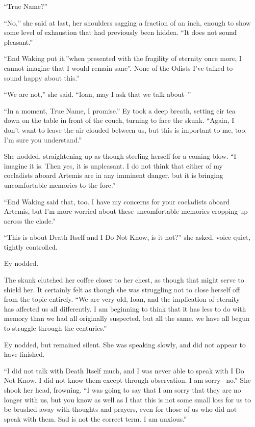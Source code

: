 ``True Name?''

``No,'' she said at last, her shoulders sagging a fraction of an inch, enough to show some level of exhaustion that had previously been hidden. ``It does not sound pleasant.''

``End Waking put it,''when presented with the fragility of eternity once more, I cannot imagine that I would remain sane''. None of the Odists I've talked to sound happy about this.''

``We are not,'' she said. ``Ioan, may I ask that we talk about--''

``In a moment, True Name, I promise.'' Ey took a deep breath, setting eir tea down on the table in front of the couch, turning to face the skunk. ``Again, I don't want to leave the air clouded between us, but this is important to me, too. I'm sure you understand.''

She nodded, straightening up as though steeling herself for a coming blow. ``I imagine it is. Then yes, it is unpleasant. I do not think that either of my cocladists aboard Artemis are in any imminent danger, but it is bringing uncomfortable memories to the fore.''

``End Waking said that, too. I have my concerns for your cocladists aboard Artemis, but I'm more worried about these uncomfortable memories cropping up across the clade.''

``This is about Death Itself and I Do Not Know, is it not?'' she asked, voice quiet, tightly controlled.

Ey nodded.

The skunk clutched her coffee closer to her chest, as though that might serve to shield her. It certainly felt as though she was struggling not to close herself off from the topic entirely. ``We are very old, Ioan, and the implication of eternity has affected us all differently. I am beginning to think that it has less to do with memory than we had all originally suspected, but all the same, we have all begun to struggle through the centuries.''

Ey nodded, but remained silent. She was speaking slowly, and did not appear to have finished.

``I did not talk with Death Itself much, and I was never able to speak with I Do Not Know. I did not know them except through observation. I am sorry-- no.'' She shook her head, frowning. ``I was going to say that I am sorry that they are no longer with us, but you know as well as I that this is not some small loss for us to be brushed away with thoughts and prayers, even for those of us who did not speak with them. Sad is not the correct term. I am anxious.''


